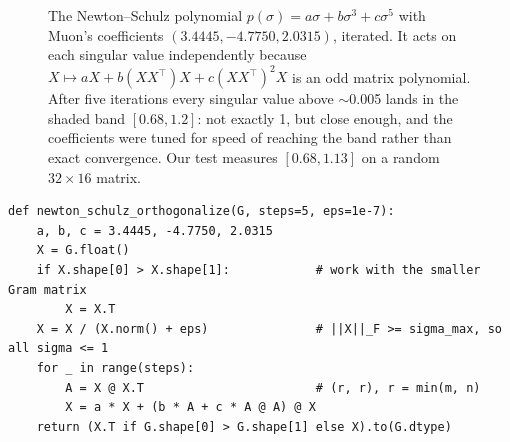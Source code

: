 \begin{figure}[t]
\caption{The Newton--Schulz polynomial $p(\sigma)=a\sigma+b\sigma^3+c\sigma^5$ with Muon's
coefficients $(3.4445,-4.7750,2.0315)$, iterated. It acts on each singular value independently
because $X\mapsto aX+b(XX^\top)X+c(XX^\top)^2X$ is an odd matrix polynomial. After five
iterations every singular value above $\sim$0.005 lands in the shaded band $[0.68,1.2]$: not
exactly 1, but close enough, and the coefficients were tuned for speed of reaching the band
rather than exact convergence. Our test measures $[0.68,1.13]$ on a random $32\times16$ matrix.}
\label{fig:optim:ns}
\end{figure}

\begin{lstlisting}[caption={Newton--Schulz orthogonalisation, the core of Muon.},label={lst:optim:ns}]
def newton_schulz_orthogonalize(G, steps=5, eps=1e-7):
    a, b, c = 3.4445, -4.7750, 2.0315
    X = G.float()
    if X.shape[0] > X.shape[1]:            # work with the smaller Gram matrix
        X = X.T
    X = X / (X.norm() + eps)               # ||X||_F >= sigma_max, so all sigma <= 1
    for _ in range(steps):
        A = X @ X.T                        # (r, r), r = min(m, n)
        X = a * X + (b * A + c * A @ A) @ X
    return (X.T if G.shape[0] > G.shape[1] else X).to(G.dtype)
\end{lstlisting}

